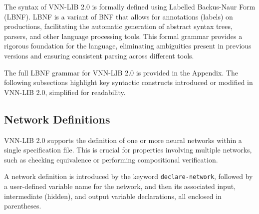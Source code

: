


The syntax of VNN-LIB 2.0 is formally defined using Labelled Backus-Naur Form (LBNF)\cite{8}. LBNF is a variant of BNF that allows for 
annotations (labels) on productions, facilitating the automatic generation of abstract syntax trees, parsers, and other language processing tools. 
This formal grammar provides a rigorous foundation for the language, eliminating ambiguities present in previous versions and ensuring consistent 
parsing across different tools.

The full LBNF grammar for VNN-LIB 2.0 is provided in the Appendix. The following subsections highlight key syntactic constructs introduced 
or modified in VNN-LIB 2.0, simplified for readability.

\subsection{Network Definitions}
VNN-LIB 2.0 supports the definition of one or more neural networks within a single specification file. This is crucial for properties involving 
multiple networks, such as checking equivalence or performing compositional verification.

A network definition is introduced by the keyword \texttt{declare-network}, followed by a user-defined variable name for the network, and then its 
associated input, intermediate (hidden), and output variable declarations, all enclosed in parentheses.

